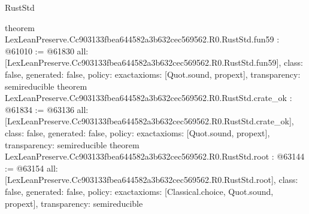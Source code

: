\begin{lexlean}{RustStd}
\begin{coremodule}
{}
theorem LexLeanPreserve.Cc903133fbea644582a3b632cec569562.R0.RustStd.fun59 : @61010 := @61830 {
  all: [LexLeanPreserve.Cc903133fbea644582a3b632cec569562.R0.RustStd.fun59],
  class: false,
  generated: false,
  policy: exact{axioms: [Quot.sound, propext]},
  transparency: semireducible
}
theorem LexLeanPreserve.Cc903133fbea644582a3b632cec569562.R0.RustStd.crate_ok : @61834 := @63136 {
  all: [LexLeanPreserve.Cc903133fbea644582a3b632cec569562.R0.RustStd.crate_ok],
  class: false,
  generated: false,
  policy: exact{axioms: [Quot.sound, propext]},
  transparency: semireducible
}
theorem LexLeanPreserve.Cc903133fbea644582a3b632cec569562.R0.RustStd.root : @63144 := @63154 {
  all: [LexLeanPreserve.Cc903133fbea644582a3b632cec569562.R0.RustStd.root],
  class: false,
  generated: false,
  policy: exact{axioms: [Classical.choice, Quot.sound, propext]},
  transparency: semireducible
}


\end{coremodule}
\end{lexlean}

